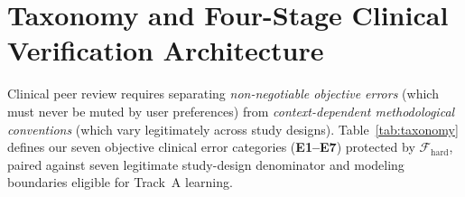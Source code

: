 \documentclass[11pt,a4paper]{article}
\begin{document}
\section{Taxonomy and Four-Stage Clinical Verification Architecture}
\label{sec:pipeline}

Clinical peer review requires separating \emph{non-negotiable objective errors} (which must never be muted by user preferences) from \emph{context-dependent methodological conventions} (which vary legitimately across study designs). Table~\ref{tab:taxonomy} defines our seven objective clinical error categories (\textbf{E1--E7}) protected by $\mathcal{F}_{\text{hard}}$, paired against seven legitimate study-design denominator and modeling boundaries eligible for Track~A learning.
\end{document}
